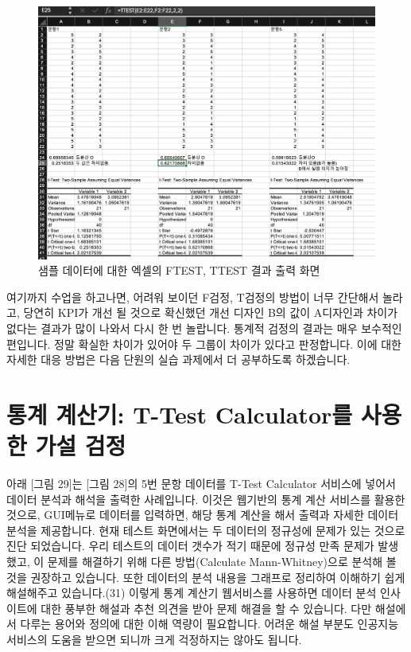 \documentclass[
  letterpaper,
]{book}
\begin{document}
\begin{figure}[H]

{\centering \includegraphics{img/fig28.png}

}

\caption{샘플 데이터에 대한 엑셀의 FTEST, TTEST 결과 출력 화면}

\end{figure}%

여기까지 수업을 하고나면, 어려워 보이던 F검정, T검정의 방법이 너무
간단해서 놀라고, 당연히 KPI가 개선 될 것으로 확신했던 개선 디자인 B의
값이 A디자인과 차이가 없다는 결과가 많이 나와서 다시 한 번 놀랍니다.
통계적 검정의 결과는 매우 보수적인 편입니다. 정말 확실한 차이가 있어야
두 그룹이 차이가 있다고 판정합니다. 이에 대한 자세한 대응 방법은 다음
단원의 실습 과제에서 더 공부하도록 하겠습니다.

\section{통계 계산기: T-Test Calculator를 사용한 가설
검정}\label{uxd1b5uxacc4-uxacc4uxc0b0uxae30-t-test-calculatoruxb97c-uxc0acuxc6a9uxd55c-uxac00uxc124-uxac80uxc815}

아래 {[}그림 29{]}는 {[}그림 28{]}의 5번 문항 데이터를 T-Test Calculator
서비스에 넣어서 데이터 분석과 해석을 출력한 사례입니다. 이것은 웹기반의
통계 계산 서비스를 활용한 것으로, GUI메뉴로 데이터를 입력하면, 해당 통계
계산을 해서 출력과 자세한 데이터 분석을 제공합니다. 현재 테스트
화면에서는 두 데이터의 정규성에 문제가 있는 것으로 진단 되었습니다. 우리
테스트의 데이터 갯수가 적기 때문에 정규성 만족 문제가 발생했고, 이
문제를 해결하기 위해 다른 방법(Calculate Mann-Whitney)으로 분석해 볼
것을 권장하고 있습니다. 또한 데이터의 분석 내용을 그래프로 정리하여
이해하기 쉽게 해설해주고 있습니다.(31) 이렇게 통계 계산기 웹서비스를
사용하면 데이터 분석 인사이트에 대한 풍부한 해설과 추천 의견을 받아 문제
해결을 할 수 있습니다. 다만 해설에서 다루는 용어와 정의에 대한 이해
역량이 필요합니다. 어려운 해설 부분도 인공지능 서비스의 도움을 받으면
되니까 크게 걱정하지는 않아도 됩니다.
\end{document}

